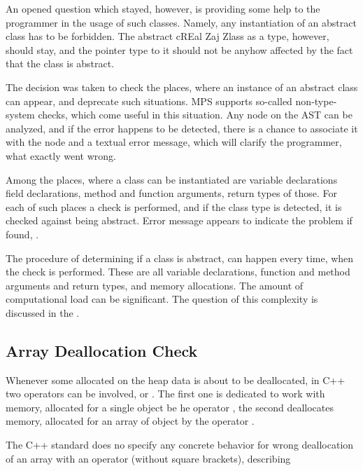 
An opened question which stayed, however, is providing some help to the programmer in the usage of such classes. Namely, any instantiation
of an abstract class has to be forbidden. The abstract cREal Zaj Zlass as a type, however, should stay, and the pointer type to it should not
be anyhow affected by the fact that the class is abstract.

The decision was taken to check the places, where an instance of an abstract class can appear, and deprecate such situations.
MPS supports so-called non-type-system checks, which come useful in this situation. Any node on the AST can be analyzed, and 
if the error happens to be detected, there is a chance to associate it with the node and a textual error message, which will
clarify the programmer, what exactly went wrong. 

Among the places, where a class can be instantiated are variable declarations field declarations, method and function arguments,
return types of those. For each of such places a check is performed, and if the class type is detected, it is checked against
being abstract. Error message appears to indicate the problem if found, . 

The procedure of determining if a class is abstract, can happen every time, when the check is performed. These are all 
variable declarations, function and method arguments and return types, and memory allocations. The amount of computational
load can be significant. The question of this complexity is discussed in the .


\subsection{Array Deallocation Check}
Whenever some allocated on the heap data is about to be deallocated, in C++ two operators can
be involved,  or . The first one is dedicated to work with memory, allocated
for a single object be he operator , the second deallocates memory, allocated for an array
of object by the operator .

The C++ standard does no specify any concrete behavior for wrong deallocation of an array with 
an operator  (without square brackets), describing



